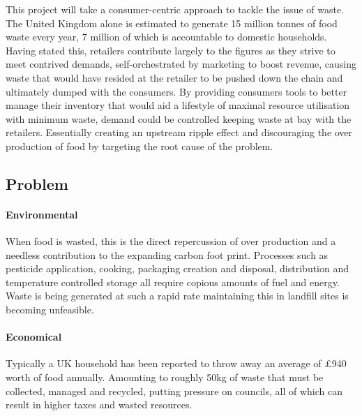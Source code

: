 \documentclass[a4paper, 11pt]{article}
\begin{document}
\vspace{\baselineskip}

This project will take a consumer-centric approach to tackle the issue of waste. The United Kingdom alone is estimated to generate 15 million tonnes of food waste every year, 7 million of which is accountable to domestic households. Having stated this, retailers contribute largely to the figures as they strive to meet contrived demands, self-orchestrated by marketing to boost revenue, causing waste that would have resided at the retailer to be pushed down the chain and ultimately dumped with the consumers. By providing consumers tools to better manage their inventory that would aid a lifestyle of maximal resource utilisation with minimum waste, demand could be controlled keeping waste at bay with the retailers. Essentially creating an upstream ripple effect and discouraging the over production of food by targeting the root cause of the problem.



\vspace{\baselineskip}
\vspace{\baselineskip}
\vspace{\baselineskip}

\subsection{Problem}
\paragraph{Environmental} When food is wasted, this is the direct repercussion of over production and a needless contribution to the expanding carbon foot print. Processes such as pesticide application, cooking, packaging creation and disposal, distribution and temperature controlled storage all require copious amounts of fuel and energy. Waste is being generated at such a rapid rate maintaining this in landfill sites is becoming unfeasible.

\paragraph{Economical} Typically a UK household has been reported to throw away an average of \pounds940 worth of food annually. Amounting to roughly 50kg of waste that must be collected, managed and recycled, putting pressure on councils, all of which can result in higher taxes and wasted resources.
\end{document}
